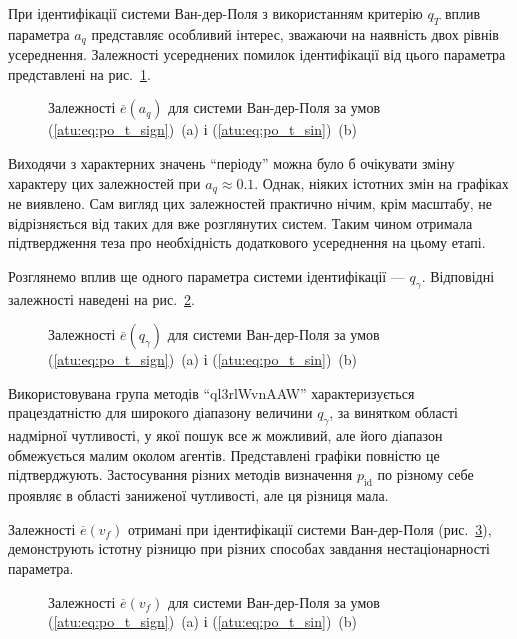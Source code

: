 При ідентифікації системи Ван-дер-Поля з використанням критерію
$q_T$ вплив параметра
$a_q$ представляє особливий інтерес, зважаючи на наявність двох
рівнів усереднення. Залежності усереднених помилок ідентифікації
від цього параметра представлені на рис.~\ref{atu:f:vdp_e_a_q}.

\begin{figure}[ht!]
  \caption{Залежності $\overline{e}(a_q)$ для системи Ван-дер-Поля за умов (\ref{atu:eq:po_t_sign})~(a) і (\ref{atu:eq:po_t_sin})~(b)}
\label{atu:f:vdp_e_a_q}
\end{figure}

Виходячи з характерних значень ``періоду'' можна було б очікувати
зміну характеру цих залежностей при
$a_q \approx 0.1 $. Однак, ніяких істотних змін на графіках не
виявлено. Сам вигляд цих залежностей практично нічим, крім
масштабу, не відрізняється від таких для вже розглянутих
систем. Таким чином отримала підтвердження теза про необхідність
додаткового усереднення на цьому етапі.

Розглянемо вплив ще одного параметра системи ідентифікації ---
$q_\gamma$. Відповідні залежності наведені на рис.~\ref{atu:f:vdp_e_q_gamma}.

\begin{figure}[ht!]
  \caption{Залежності $\overline{e}(q_\gamma)$ для системи Ван-дер-Поля за умов (\ref{atu:eq:po_t_sign})~(a) і (\ref{atu:eq:po_t_sin})~(b)}
\label{atu:f:vdp_e_q_gamma}
\end{figure}

Використовувана група методів ``ql3rlWvnAAW'' характеризується
працездатністю для широкого діапазону величини
$q_\gamma$, за винятком області надмірної чутливості, у
якої пошук все ж можливий, але його діапазон обмежується
малим околом агентів. Представлені графіки повністю це
підтверджують. Застосування різних методів визначення
$p_\mathrm{id} $ по різному себе проявляє в області заниженої
чутливості, але ця різниця мала.


Залежності
$\overline{e} (v_f) $ отримані при ідентифікації системи Ван-дер-Поля
(рис.~\ref{atu:f:vdp_e_v_f}), демонструють істотну різницю при різних
способах завдання нестаціонарності параметра.

\begin{figure}[ht!]
  \caption{Залежності $\overline{e}(v_f)$ для системи Ван-дер-Поля за умов (\ref{atu:eq:po_t_sign})~(a) і (\ref{atu:eq:po_t_sin})~(b)}
\label{atu:f:vdp_e_v_f}
\end{figure}

